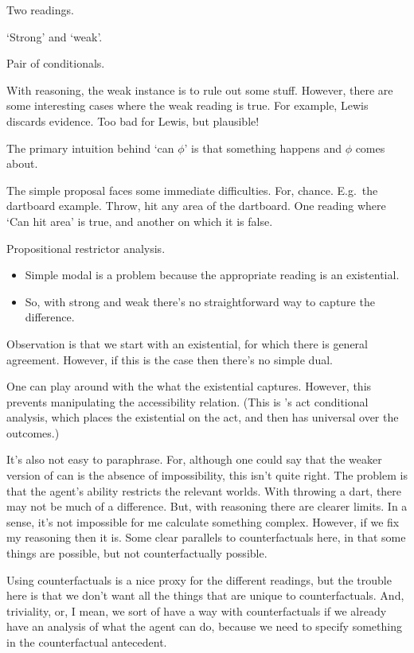 \documentclass[10pt]{article}
\begin{document}
Two readings.

`Strong' and `weak'.

Pair of conditionals.

With reasoning, the weak instance is to rule out some stuff.
However, there are some interesting cases where the weak reading is true.
For example, Lewis discards evidence.
Too bad for Lewis, but plausible!

The primary intuition behind `can \(\phi\)' is that something happens and \(\phi\) comes about.




The simple proposal faces some immediate difficulties.
For, chance.
E.g.\ the dartboard example.
Throw, hit any area of the dartboard.
One reading where `Can hit area' is true, and another on which it is false.


Propositional restrictor analysis.

\begin{itemize}
\item Simple modal is a problem because the appropriate reading is an existential.
\item So, with strong and weak there's no straightforward way to capture the difference.
\end{itemize}

Observation is that we start with an existential, for which there is general agreement.
However, if this is the case then there's no simple dual.

One can play around with the what the existential captures.
However, this prevents manipulating the accessibility relation.
(This is \citeauthor{Mandelkern:2017aa}'s act conditional analysis, which places the existential on the act, and then has universal over the outcomes.)

It's also not easy to paraphrase.
For, although one could say that the weaker version of can is the absence of impossibility, this isn't quite right.
The problem is that the agent's ability restricts the relevant worlds.
With throwing a dart, there may not be much of a difference.
But, with reasoning there are clearer limits.
In a sense, it's not impossible for me calculate something complex.
However, if we fix my reasoning then it is.
Some clear parallels to counterfactuals here, in that some things are possible, but not counterfactually possible.

Using counterfactuals is a nice proxy for the different readings, but the trouble here is that we don't want all the things that are unique to counterfactuals.
And, triviality, or, I mean, we sort of have a way with counterfactuals if we already have an analysis of what the agent can do, because we need to specify something in the counterfactual antecedent.
\end{document}
